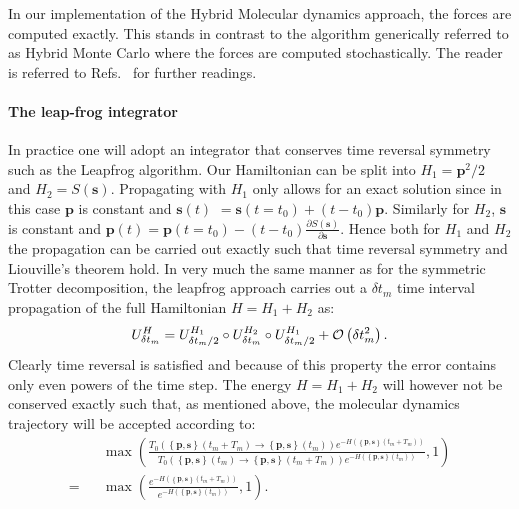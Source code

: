 In our  implementation of  the Hybrid Molecular  dynamics   approach,  the forces  are computed  exactly.  This  stands in contrast to the  algorithm  generically  
referred  to  as  Hybrid Monte Carlo  where the forces  are  computed  stochastically.  The  reader is referred to Refs.~\cite{Duane87,Beyl17}  for   further  readings. 

\paragraph{The leap-frog integrator}
  In practice one will adopt an  integrator  that conserves  time reversal symmetry such as the Leapfrog  algorithm.   Our Hamiltonian can be split into 
 $H_1   = \pmb{p}^2/2 $ and $H_2   =  S(\pmb{s} ) $.     Propagating with $H_1$ only allows for an exact solution since in this case $\pmb{p}$ is constant and $  \pmb{s}(t) $  $= \pmb{s}(t=t_0) + (  t - t_0)\pmb{p}   $.  Similarly for $H_2 $, $\pmb{s}$  is constant and 
 $ \pmb{p}(t)   = \pmb{p}(t=t_0)  -(   t - t_0) \frac{\partial S(\pmb{s} )}{\partial \pmb{s} }   $.  Hence  both for $H_1 $ and $H_2$   the propagation  can be carried out exactly   such that time reversal symmetry and  Liouville's theorem hold.  In very much the same manner as for the symmetric Trotter decomposition, the leapfrog approach carries  out a  $\delta t_m$ time interval propagation  of the full Hamiltonian $H = H_1 + H_2 $ as: 
 \begin{equation}	
 	 U^H_{\delta t_m}    = U^{H_1}_{\delta t_m/2}  \circ  U^{H_2}_{\delta t_m } \circ  U^{H_1}_{\delta t_m/2}   +{\cal O } \left(  \delta t_m^2 \right). 
 \end{equation}
Clearly  time reversal is satisfied and because of this property the error  contains only even powers of the  time step. The energy $H =  H_1 + H_2 $ will however not be conserved exactly  such that, as mentioned above, the molecular dynamics trajectory  will be accepted according to:
\begin{eqnarray}
	& & \max \left(   
	 \frac{T_0 \left(  \left\{ \pmb{p},  \pmb{s} \right\}  (t_m  + T_m)    \rightarrow   \left\{  \pmb{p},  \pmb{s} \right\} (t_m)  \right) e^{-H( \left\{ \pmb{p},  \pmb{s} \right\}  (t_m  + T_m) ) } }{
 T_0 \left(  \left\{ \pmb{p},  \pmb{s} \right\}  (t_m  )    \rightarrow   \left\{  \pmb{p},  \pmb{s} \right\} (t_m + T_m)  \right) e^{-H( \left\{ \pmb{p},  \pmb{s} \right\}  (t_m  ) ) }} , 1 \right) \nonumber \\
 = & &  \max \left(   
	 \frac{ e^{-H( \left\{ \pmb{p},  \pmb{s} \right\}  (t_m  + T_m) ) } }{
                   e^{-H( \left\{ \pmb{p},  \pmb{s} \right\}  (t_m  ) ) }} , 1 \right).
\end{eqnarray}

